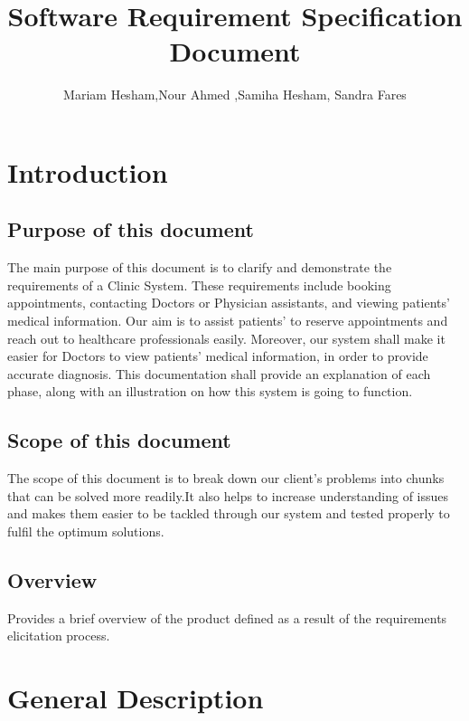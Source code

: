 \documentclass[]{article}
\title{Software Requirement Specification Document}
\author{Mariam Hesham,Nour Ahmed ,Samiha Hesham, Sandra Fares }
\begin{document}
\maketitle

\section{Introduction}

\subsection{Purpose of this document}
The main purpose of this document is to clarify and demonstrate the requirements of a Clinic System. These requirements include booking appointments, contacting Doctors or Physician assistants, and viewing patients' medical information. Our aim is to assist patients' to reserve appointments and reach out to healthcare professionals easily. Moreover, our system shall make it easier for Doctors to view patients' medical information, in order to provide accurate diagnosis. This documentation shall provide an explanation of each phase, along with an illustration on how this system is going to function. 

\subsection{ Scope of this document}
The scope of this document is to break down our client's problems into chunks that can be solved more readily.It also helps to increase understanding of issues and makes them easier to be tackled through our system and tested properly to fulfil the optimum solutions. 


\subsection{Overview}
Provides a brief overview of the product defined as a result of the requirements elicitation process. 


\section{General Description}
\end{document}
